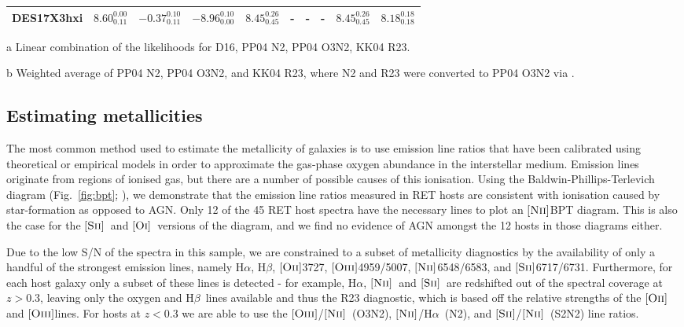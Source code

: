 \documentclass[fleqn,usenatbib,]{mnras}
\newcommand{\halpha}[0]{H$\alpha$}
\newcommand{\hbeta}[0]{H$\beta$}
\newcommand{\OII}[0]{$[\textnormal{\textsc{Oii}}]$}
\newcommand{\OI}[0]{$[\textnormal{\textsc{Oi}}]$}
\newcommand{\OIII}[0]{$[\textnormal{\textsc{Oiii}}]$}
\newcommand{\SII}[0]{$[\textnormal{\textsc{Sii}}]$}
\newcommand{\NII}[0]{$[\textnormal{\textsc{Nii}}]$}
\begin{document}
\begin{table}
\begin{threeparttable}
\begin{tabular}{lrrrllllll}
DES17X3hxi  &   $8.60 _{\scriptscriptstyle 0.11} ^{\scriptscriptstyle 0.00}$ &  $-0.37 _{\scriptscriptstyle 0.11} ^{\scriptscriptstyle 0.10}$ &   $-8.96 _{\scriptscriptstyle 0.00} ^{\scriptscriptstyle 0.10}$ &  $8.45 _{\scriptscriptstyle 0.45} ^{\scriptscriptstyle 0.26}$ &                                                             - &                                                             - &                                                             - &  $8.45 _{\scriptscriptstyle 0.45} ^{\scriptscriptstyle 0.26}$ &  $8.18 _{\scriptscriptstyle 0.18} ^{\scriptscriptstyle 0.18}$ \\

\bottomrule
\end{tabular}
\begin{tablenotes}
\item[a] Linear combination of the likelihoods for D16, PP04 N2, PP04 O3N2, KK04 R23.
\item[b] Weighted average of PP04 N2, PP04 O3N2, and KK04 R23, where N2 and R23 were converted to PP04 O3N2 via \citet{Kewley2008}.

\end{tablenotes}
\end{threeparttable}
\label{tab:derived}
\end{table}

\subsection{Estimating metallicities \label{subsec:calc_Z}}

The most common method used to estimate the metallicity of galaxies is to use emission line ratios that have been calibrated using theoretical or empirical models in order to approximate the gas-phase oxygen abundance in the interstellar medium. Emission lines originate from regions of ionised gas, but there are a number of possible causes of this ionisation. Using the Baldwin-Phillips-Terlevich diagram (Fig.~\ref{fig:bpt}; \citealt{Baldwin1981}), we demonstrate that the emission line ratios measured in RET hosts are consistent with ionisation caused by star-formation as opposed to AGN. Only 12 of the 45 RET host spectra have the necessary lines to plot an \NII BPT diagram. This is also the case for the \SII~and \OI~versions of the diagram, and we find no evidence of AGN amongst the 12 hosts in those diagrams either.

Due to the low S/N of the spectra in this sample, we are constrained to a subset of metallicity diagnostics by the availability of only a handful of the strongest emission lines, namely \halpha, \hbeta, \OII 3727, \OIII 4959/5007, \NII 6548/6583, and \SII 6717/6731. Furthermore, for each host galaxy only a subset of these lines is detected - for example, \halpha, \NII~and \SII~are redshifted out of the spectral coverage at $z>0.3$, leaving only the oxygen and \hbeta~lines available and thus the R23 diagnostic, which is based off the relative strengths of the \OII and \OIII lines. For hosts at $z<0.3$ we are able to use the \OIII /\NII~(O3N2), \NII /\halpha~(N2), and \SII /\NII~(S2N2) line ratios. 
\end{document}

